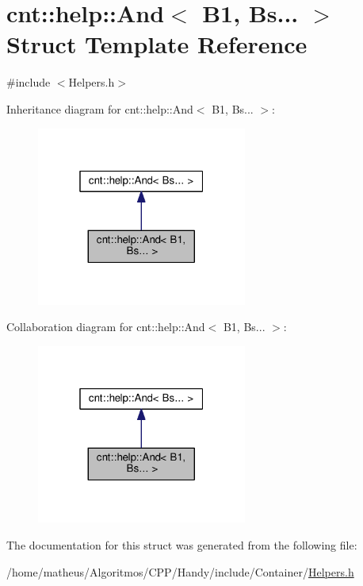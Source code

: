 \hypertarget{structcnt_1_1help_1_1And_3_01B1_00_01Bs_8_8_8_01_4}{}\section{cnt\+:\+:help\+:\+:And$<$ B1, Bs... $>$ Struct Template Reference}
\label{structcnt_1_1help_1_1And_3_01B1_00_01Bs_8_8_8_01_4}


{\ttfamily \#include $<$Helpers.\+h$>$}



Inheritance diagram for cnt\+:\+:help\+:\+:And$<$ B1, Bs... $>$\+:\nopagebreak
\begin{figure}[H]
\begin{center}
\leavevmode
\includegraphics[width=196pt]{structcnt_1_1help_1_1And_3_01B1_00_01Bs_8_8_8_01_4__inherit__graph}
\end{center}
\end{figure}


Collaboration diagram for cnt\+:\+:help\+:\+:And$<$ B1, Bs... $>$\+:\nopagebreak
\begin{figure}[H]
\begin{center}
\leavevmode
\includegraphics[width=196pt]{structcnt_1_1help_1_1And_3_01B1_00_01Bs_8_8_8_01_4__coll__graph}
\end{center}
\end{figure}


The documentation for this struct was generated from the following file\+:\begin{DoxyCompactItemize}
\item 
/home/matheus/\+Algoritmos/\+C\+P\+P/\+Handy/include/\+Container/\hyperlink{Container_2Helpers_8h}{Helpers.\+h}\end{DoxyCompactItemize}
